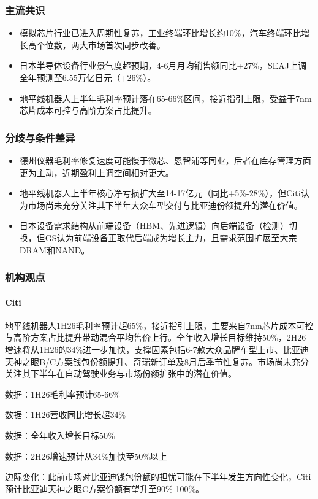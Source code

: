 \documentclass[11pt]{ctexart}
\begin{document}
\subsubsection*{主流共识}
\begin{itemize}
  \item 模拟芯片行业已进入周期性复苏，工业终端环比增长约10\%，汽车终端环比增长高个位数，两大市场首次同步改善。
  \item 日本半导体设备行业景气度超预期，4-6月月均销售额同比+27\%，SEAJ上调全年预测至6.55万亿日元（+26\%）。
  \item 地平线机器人上半年毛利率预计落在65-66\%区间，接近指引上限，受益于7nm芯片成本可控与高阶方案占比提升。
\end{itemize}
\subsubsection*{分歧与条件差异}
\begin{itemize}
  \item 德州仪器毛利率修复速度可能慢于微芯、恩智浦等同业，后者在库存管理方面更为主动，近期盈利上调空间相对更大。
  \item 地平线机器人上半年核心净亏损扩大至14-17亿元（同比+5\%-28\%），但Citi认为市场尚未充分关注其下半年大众车型交付与比亚迪份额提升的潜在价值。
  \item 日本设备需求结构从前端设备（HBM、先进逻辑）向后端设备（检测）切换，但GS认为前端设备正取代后端成为增长主力，且需求范围扩展至大宗DRAM和NAND。
\end{itemize}
\subsubsection*{机构观点}
\paragraph{Citi} 地平线机器人1H26毛利率预计超65\%，接近指引上限，主要来自7nm芯片成本可控与高阶方案占比提升带动混合平均售价上行。全年收入增长目标维持50\%，2H26增速将从1H26的34\%进一步加快，支撑因素包括6-7款大众品牌车型上市、比亚迪天神之眼B/C方案钱包份额提升、奇瑞新订单及8月后季节性复苏。市场尚未充分关注其下半年在自动驾驶业务与市场份额扩张中的潜在价值。
{\small\color{refgray}数据：1H26毛利率预计65-66\%\par}
{\small\color{refgray}数据：1H26营收同比增长超34\%\par}
{\small\color{refgray}数据：全年收入增长目标50\%\par}
{\small\color{refgray}数据：2H26增速预计从34\%加快至50\%以上\par}
{\small\color{refgray}边际变化：此前市场对比亚迪钱包份额的担忧可能在下半年发生方向性变化，Citi预计比亚迪天神之眼C方案份额有望升至90\%-100\%。\par}
\end{document}
